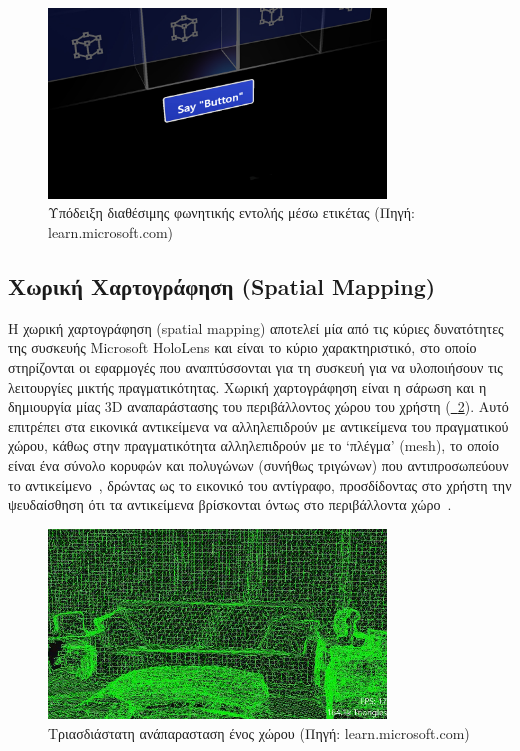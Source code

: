 \begin{enumerate}
    \begin{figure}[!ht]
        \centering
        \includegraphics[width=0.8\textwidth]{images/hololens_interaction_voice.jpg}
        \caption[Υπόδειξη διαθέσιμης φωνητικής εντολής μέσω ετικέτας]{Υπόδειξη διαθέσιμης φωνητικής εντολής μέσω ετικέτας {\footnotesize (Πηγή: learn.microsoft.com)}}\label{fig:hololensInteractionVoice}
    \end{figure}
\end{enumerate}

\subsection{Χωρική Χαρτογράφηση (Spatial Mapping)}\label{subsec:hololensSpatialMapping}
Η χωρική χαρτογράφηση (spatial mapping) αποτελεί μία από τις κύριες δυνατότητες της συσκευής Microsoft HoloLens και είναι το κύριο χαρακτηριστικό, στο οποίο στηρίζονται οι εφαρμογές που αναπτύσσονται για τη συσκευή για να υλοποιήσουν τις λειτουργίες μικτής πραγματικότητας. Χωρική χαρτογράφηση είναι η σάρωση και η δημιουργία μίας 3D αναπαράστασης του περιβάλλοντος χώρου του χρήστη (\hyperref[fig:spatialMappingExample]{\schema~\ref*{fig:spatialMappingExample}}). Αυτό επιτρέπει στα εικονικά αντικείμενα να αλληλεπιδρούν με αντικείμενα του πραγματικού χώρου, κάθως στην πραγματικότητα αλληλεπιδρούν με το `πλέγμα' (mesh), το οποίο είναι ένα σύνολο κορυφών και πολυγώνων (συνήθως τριγώνων) που αντιπροσωπεύουν το αντικείμενο~\cite{a2006_mesh}, δρώντας ως το εικονικό του αντίγραφο, προσδίδοντας στο χρήστη την ψευδαίσθηση ότι τα αντικείμενα βρίσκονται όντως στο περιβάλλοντα χώρο~\cite{mattzmsft_2023_spatial}.

\begin{figure}[!ht]
    \centering
    \includegraphics[width=0.8\textwidth]{images/spatial_mapping_example.jpg}
    \caption[Τριασδιάστατη ανάπαρασταση ένος χώρου]{Τριασδιάστατη ανάπαρασταση ένος χώρου {\footnotesize (Πηγή: learn.microsoft.com)}}\label{fig:spatialMappingExample}
\end{figure}

